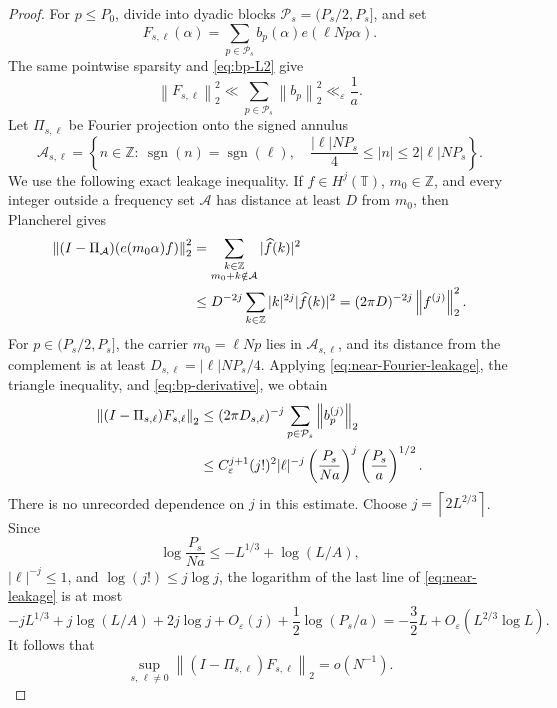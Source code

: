 \documentclass[11pt]{article}
\numberwithin{equation}{section}
\theoremstyle{definition}
\newcommand{\T}{\mathbb T}
\newcommand{\Z}{\mathbb Z}
\newcommand{\1}{\mathbf 1}
\newcommand{\sgn}{\operatorname{sgn}}
\newcommand{\norm}[1]{\left\lVert#1\right\rVert}
\newcommand{\ceil}[1]{\left\lceil#1\right\rceil}
\begin{document}
\begin{proof}
For \(p\le P_0\), divide into dyadic blocks
\(\mathcal P_s=(P_s/2,P_s]\), and set
\[
 F_{s,\ell}(\alpha)=
 \sum_{p\in\mathcal P_s}b_p(\alpha)e(\ell Np\alpha).
\]
The same pointwise sparsity and \eqref{eq:bp-L2} give
\begin{equation}\label{eq:near-Qblock}
 \norm{F_{s,\ell}}_2^2
 \ll\sum_{p\in\mathcal P_s}\norm{b_p}_2^2
 \ll_\varepsilon\frac1a.
\end{equation}
Let \(\Pi_{s,\ell}\) be Fourier projection onto the signed annulus
\[
 \mathcal A_{s,\ell}=
 \left\{n\in\Z:\
 \sgn(n)=\sgn(\ell),\quad
 \frac{|\ell|NP_s}{4}\le|n|\le2|\ell|NP_s\right\}.
\]
We use the following exact leakage inequality.  If \(f\in H^j(\T)\),
\(m_0\in\Z\), and every integer outside a frequency set
\(\mathcal A\) has distance at least \(D\) from \(m_0\), then
Plancherel gives
\begin{align}
 \norm{(I-\Pi_{\mathcal A})(e(m_0\alpha)f)}_2^2
 &=\sum_{\substack{k\in\Z\\m_0+k\notin\mathcal A}}
 |\widehat f(k)|^2\notag\\
 &\le D^{-2j}\sum_{k\in\Z}|k|^{2j}|\widehat f(k)|^2
 =(2\pi D)^{-2j}\norm{f^{(j)}}_2^2.
 \label{eq:near-Fourier-leakage}
\end{align}
For \(p\in(P_s/2,P_s]\), the carrier \(m_0=\ell Np\) lies in
\(\mathcal A_{s,\ell}\), and its distance from the complement is at
least \(D_{s,\ell}=|\ell|NP_s/4\).  Applying
\eqref{eq:near-Fourier-leakage}, the triangle inequality, and
\eqref{eq:bp-derivative}, we obtain
\begin{align}
 \norm{(I-\Pi_{s,\ell})F_{s,\ell}}_2
 &\le(2\pi D_{s,\ell})^{-j}
 \sum_{p\in\mathcal P_s}\norm{b_p^{(j)}}_2\notag\\
 &\le C_\varepsilon^{j+1}(j!)^2|\ell|^{-j}
 \left(\frac{P_s}{Na}\right)^j
 \left(\frac{P_s}{a}\right)^{1/2}.
 \label{eq:near-leakage}
\end{align}
There is no unrecorded dependence on \(j\) in this estimate.  Choose
\(j=\ceil{2L^{2/3}}\).  Since
\[
 \log\frac{P_s}{Na}\le-L^{1/3}+\log(L/A),
\]
\(|\ell|^{-j}\le1\), and \(\log(j!)\le j\log j\), the logarithm of
the last line of \eqref{eq:near-leakage} is at most
\[
 -jL^{1/3}+j\log(L/A)+2j\log j+O_\varepsilon(j)
 +\frac12\log(P_s/a)
 =-\frac32L+O_\varepsilon(L^{2/3}\log L).
\]
It follows that
\begin{equation}\label{eq:near-leakage-small}
 \sup_{s,\,\ell\ne0}
 \norm{(I-\Pi_{s,\ell})F_{s,\ell}}_2=o(N^{-1}).
\end{equation}


\end{proof}
\end{document}
